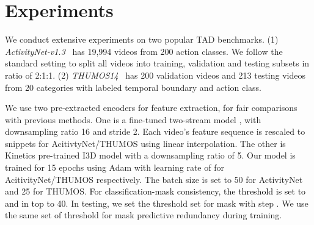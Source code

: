 \documentclass[runningheads]{llncs}
\begin{document}
\section{Experiments}
\label{sec:exp}
We conduct extensive experiments on two popular TAD benchmarks.
(1) \textit{ActivityNet-v1.3}~\cite{caba2015activitynet} has 19,994 videos from 200 action classes. We follow the standard setting to split all videos into training, validation and testing subsets 
in ratio of 2:1:1.
(2) \textit{THUMOS14}~\cite{idrees2017thumos} has 200 validation videos and 213 testing videos from 20 categories with labeled temporal boundary and action class. 


We use two pre-extracted encoders for feature extraction, for fair comparisons with previous methods. 
One is a fine-tuned two-stream model \cite{lin2019bmn}, with downsampling ratio 16 and stride 2. Each video's feature sequence  is rescaled to  snippets for AcitivtyNet/THUMOS using linear interpolation. The other is Kinetics pre-trained I3D model \cite{carreira2017quo} with a downsampling ratio of 5. 
Our model is trained for 15 epochs using Adam with learning rate of { for AcitivityNet/THUMOS respectively. The batch size is set to 50 for ActivityNet and 25 for THUMOS}. 
\textcolor{black}{For classification-mask consistency, the threshold  is set to  and in top to 40}. In testing, 
we set the threshold set for mask  with step . We use the same set of threshold  for mask predictive redundancy during training.
\end{document}
